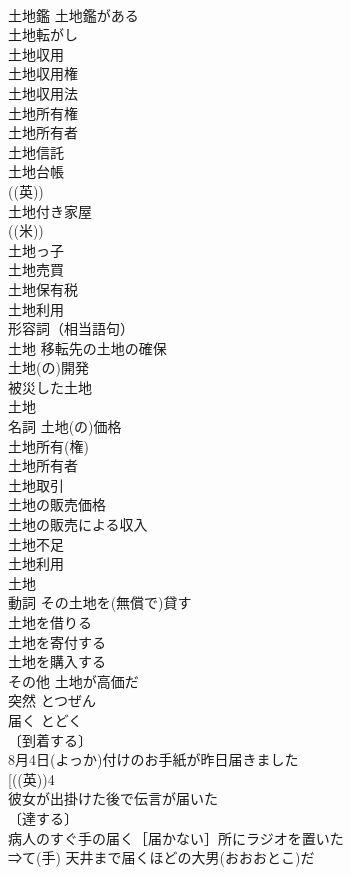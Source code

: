 \documentclass[8pt]{extreport}
\begin{document}
\begin{CJK}{UTF8}{min}
\\	土地鑑 土地鑑がある 
\\	土地転がし 
\\	土地収用 
\\	土地収用権 
\\	土地収用法 
\\	土地所有権 
\\	土地所有者 
\\	土地信託 
\\	土地台帳 
\\	((英)) 
\\	土地付き家屋 
\\	((米)) 
\\	土地っ子 
\\	土地売買 
\\	土地保有税 
\\	土地利用 
\\	形容詞（相当語句） 
\\	土地 移転先の土地の確保 
\\	土地(の)開発 
\\	被災した土地 
\\	土地 
\\	名詞 土地(の)価格 
\\	土地所有(権) 
\\	土地所有者 
\\	土地取引 
\\	土地の販売価格 
\\	土地の販売による収入 
\\	土地不足 
\\	土地利用 
\\	土地 
\\	動詞 その土地を(無償で)貸す 
\\	土地を借りる 
\\	土地を寄付する 
\\	土地を購入する 
\\	その他 土地が高価だ 
\\	突然	とつぜん	
\\	届く	とどく	
\\	〔到着する〕 
\\	8月4日(よっか)付けのお手紙が昨日届きました 
\\	[((英))4 
\\	彼女が出掛けた後で伝言が届いた 
\\	〔達する〕 
\\	病人のすぐ手の届く［届かない］所にラジオを置いた 
\\	⇒て(手) 天井まで届くほどの大男(おおおとこ)だ 

\end{CJK}
\end{document}
